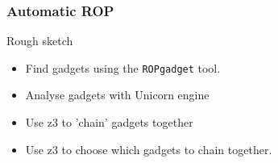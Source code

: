 \documentclass{beamer}
\begin{document}
\begin{frame}
    \frametitle{Automatic ROP}
    Rough sketch
    \begin{itemize}
        \item Find gadgets using the \texttt{ROPgadget} tool.
        \item Analyse gadgets with Unicorn engine
        \item Use z3 to 'chain' gadgets together
        \item Use z3 to choose which gadgets to chain together.
    \end{itemize}
\end{frame}
\end{document}

